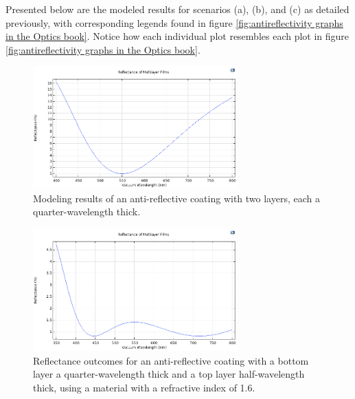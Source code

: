 Presented below are the modeled results for scenarios (a), (b), and (c) as detailed previously, with corresponding legends found in figure \ref{fig:antireflectivity graphs in the Optics book}. Notice how each individual plot resembles each plot in figure \ref{fig:antireflectivity graphs in the Optics book}.

\begin{figure}[H]
  \centering
  \includegraphics[width=0.7\textwidth]{Chapters/Figures/Chapter 4 Figures/Antireflective Figure a.png}
  \caption{Modeling results of an anti-reflective coating with two layers, each a quarter-wavelength thick.}
  \label{fig:Antireflective Figure a}
\end{figure}

\begin{figure}[H]
  \centering
  \includegraphics[width=0.7\textwidth]{Chapters/Figures/Chapter 4 Figures/Antireflective Figure b.png}
  \caption{Reflectance outcomes for an anti-reflective coating with a bottom layer a quarter-wavelength thick and a top layer half-wavelength thick, using a material with a refractive index of 1.6.}
  \label{fig:Antireflective Figure b}
\end{figure}

